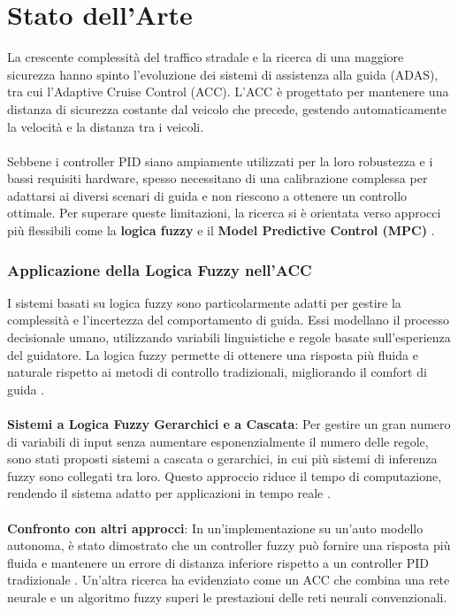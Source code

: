 \chapter{Stato dell'Arte}
La crescente complessità del traffico stradale e la ricerca di una maggiore sicurezza hanno spinto l'evoluzione dei sistemi di 
assistenza alla guida (ADAS), tra cui l'Adaptive Cruise Control (ACC). L'ACC è progettato per mantenere una distanza di sicurezza 
costante dal veicolo che precede, gestendo automaticamente la velocità e la distanza tra i veicoli.
\\\\
\noindent Sebbene i controller PID siano ampiamente utilizzati per la loro robustezza e i bassi requisiti hardware, spesso necessitano di 
una calibrazione complessa per adattarsi ai diversi scenari di guida e non riescono a ottenere un controllo ottimale. Per superare 
queste limitazioni, la ricerca si è orientata verso approcci più flessibili come la \textbf{logica fuzzy} 
e il \textbf{Model Predictive Control (MPC)} \cite{singh2015adaptive}.

\subsection*{Applicazione della Logica Fuzzy nell'ACC}
I sistemi basati su logica fuzzy sono particolarmente adatti per gestire la complessità e l'incertezza del 
comportamento di guida. Essi modellano il processo decisionale umano, utilizzando variabili linguistiche e regole 
basate sull'esperienza del guidatore. La logica fuzzy permette di ottenere una risposta più fluida e naturale rispetto 
ai metodi di controllo tradizionali, migliorando il comfort di guida \cite{simic2022cascaded}.
\\\\
\noindent \textbf{Sistemi a Logica Fuzzy Gerarchici e a Cascata}: Per gestire un gran numero di variabili di input senza aumentare 
esponenzialmente il numero delle regole, sono stati proposti sistemi a cascata o gerarchici, in cui 
più sistemi di inferenza fuzzy sono collegati tra loro. Questo approccio riduce il tempo di computazione, rendendo il sistema 
adatto per applicazioni in tempo reale \cite{simic2022cascaded}.
\\\\
\noindent\textbf{Confronto con altri approcci}: In un'implementazione su un'auto modello autonoma, è stato dimostrato che un controller 
fuzzy può fornire una risposta più fluida e mantenere un errore di distanza inferiore rispetto a un controller PID 
tradizionale \cite{alomari2020fuzzy}. Un'altra ricerca ha evidenziato come un ACC che combina una rete neurale e un algoritmo 
fuzzy superi le prestazioni delle reti neurali convenzionali.

